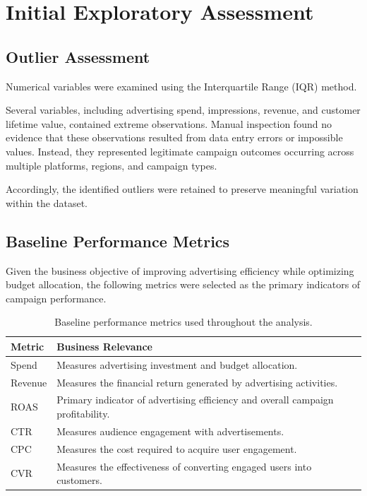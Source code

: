 \documentclass[11pt]{article}
\begin{document}
	\section{Initial Exploratory Assessment}
	
	\subsection{Outlier Assessment}
	
	Numerical variables were examined using the Interquartile Range (IQR) method.
	
	Several variables, including advertising spend, impressions, revenue, and customer lifetime value, contained extreme observations. Manual inspection found no evidence that these observations resulted from data entry errors or impossible values. Instead, they represented legitimate campaign outcomes occurring across multiple platforms, regions, and campaign types.
	
	Accordingly, the identified outliers were retained to preserve meaningful variation within the dataset.
	
	\subsection{Baseline Performance Metrics}
	
	Given the business objective of improving advertising efficiency while optimizing budget allocation, the following metrics were selected as the primary indicators of campaign performance.
	
	\begin{table}[H]
		\centering
		\begin{tabular}{lp{10cm}}
			\toprule
			Metric & Business Relevance\\
			\midrule
			Spend & Measures advertising investment and budget allocation.\\
			
			Revenue & Measures the financial return generated by advertising activities.\\
			
			ROAS & Primary indicator of advertising efficiency and overall campaign profitability.\\
			
			CTR & Measures audience engagement with advertisements.\\
			
			CPC & Measures the cost required to acquire user engagement.\\
			
			CVR & Measures the effectiveness of converting engaged users into customers.\\
			
			\bottomrule
		\end{tabular}
		\caption{Baseline performance metrics used throughout the analysis.}
	\end{table}
	
\end{document}
